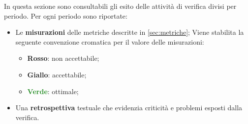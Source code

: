 In questa sezione sono consultabili gli esito delle attività di verifica divisi per periodo.\newline
Per ogni periodo sono riportate:
\begin{itemize}
	\item Le \textbf{misurazioni} delle metriche descritte in \cref{sec:metriche}; Viene stabilita la seguente convenzione cromatica per il valore delle misurazioni:
		\begin{itemize}
			\item \textcolor{BrickRed}{\textbf{Rosso}}: non accettabile;
			\item \textcolor{YellowOrange}{\textbf{Giallo}}: accettabile;
			\item \textcolor{ForestGreen}{\textbf{Verde}}: ottimale;
		\end{itemize}
	\item Una \textbf{retrospettiva} testuale che evidenzia criticità e problemi esposti dalla verifica.
\end{itemize}
